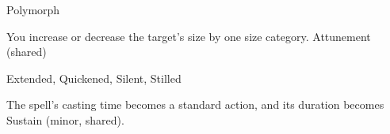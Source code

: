 \begin{spellsection}{Polymorph}
\begin{spellheader}
\end{spellheader}
\begin{spellcontent}
\begin{spelltargetinginfo}
\end{spelltargetinginfo}
\begin{spelleffects}
\spelleffect
You increase or decrease the target's size by one size category.
\spelldur Attunement (shared)
\end{spelleffects}
\end{spellcontent}
\begin{spellfooter}
 Extended, Quickened, Silent, Stilled
\end{spellfooter}
\begin{spellsubcontent}
\begin{spellcantrip}
The spell's casting time becomes a standard action, and its duration becomes Sustain (minor, shared).
\end{spellcantrip}
\end{spellsubcontent}
\end{spellsection}
